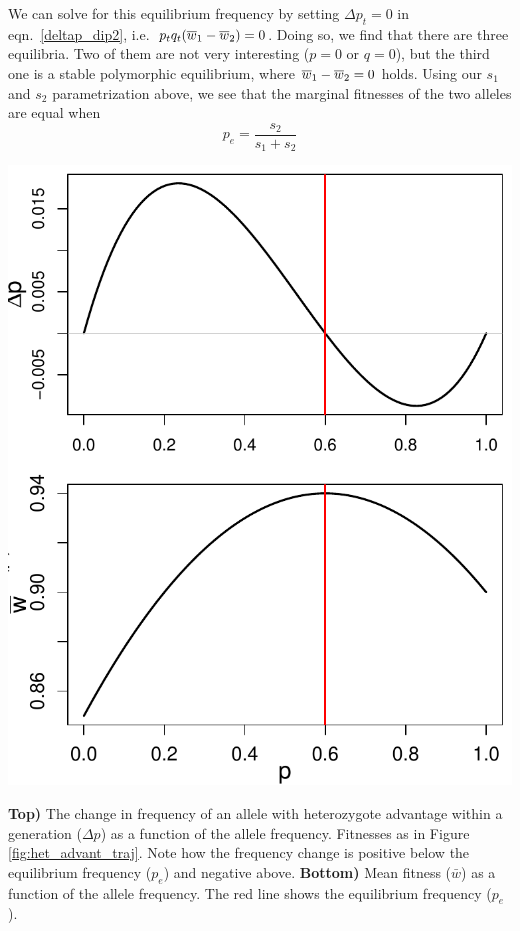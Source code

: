 We can solve for this equilibrium frequency by setting $\Delta p_t = 0$ in  eqn.\ \eqref{deltap_dip2}, 
i.e.\ $p_tq_t (\overline{w}_1-\overline{w}_2)=0$. Doing so, we find that there are
three equilibria. Two of them are not very interesting ($p=0$ or
$q=0$), but the third one is a stable polymorphic equilibrium,  where
$\overline{w}_1-\overline{w}_2=0$ holds.
Using our $s_1$ and $s_2$ parametrization above, we see that the marginal fitnesses of
the two alleles are equal when
\begin{equation}
	p_e = \frac{s_2}{s_1+s_2} \label{eqn:het_ad_eq}
  \end{equation}
      \begin{marginfigure}
\begin{center}
  \includegraphics[width = \textwidth]{figures/het_advant_dp_wbar.pdf}
\end{center}
\caption{{\bf Top)} The change in frequency of an allele with heterozygote
  advantage within a generation ($\Delta p$) as a function of the allele
frequency. Fitnesses as in Figure \ref{fig:het_advant_traj}. Note how the frequency change is positive below the
equilibrium frequency ($p_e$) and negative above. {\bf Bottom)} Mean
fitness ($\bar{w}$) as a function of the allele frequency. The red line shows
the equilibrium frequency ($p_e$). } \label{fig:het_advant_dp_wbar}
\end{marginfigure}
